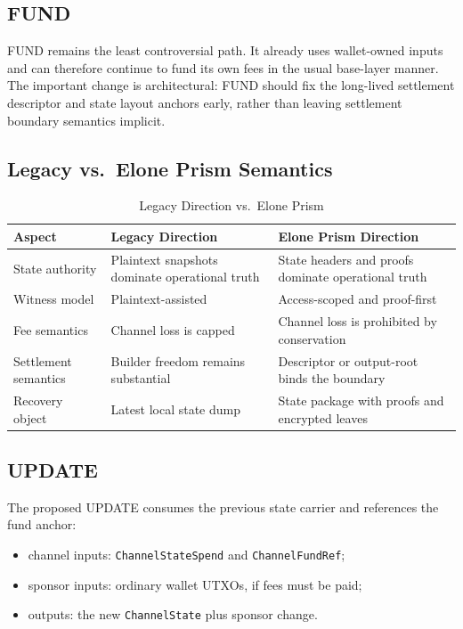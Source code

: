 \documentclass[11pt,a4paper]{article}
\newcommand{\code}[1]{\texttt{#1}}
\begin{document}
\subsection{FUND}

FUND remains the least controversial path. It already uses wallet-owned inputs and can therefore continue to fund its own fees in the usual base-layer manner. The important change is architectural: FUND should fix the long-lived settlement descriptor and state layout anchors early, rather than leaving settlement boundary semantics implicit.

\subsection{Legacy vs.\ Elone Prism Semantics}

\begin{table}[htbp]
\centering
\caption{Legacy Direction vs.\ Elone Prism}
\label{tab:legacy_vs_prism}
\small
\begin{tabularx}{\linewidth}{@{}l X X@{}}
\toprule
\textbf{Aspect} & \textbf{Legacy Direction} & \textbf{Elone Prism Direction} \\
\midrule
State authority & Plaintext snapshots dominate operational truth & State headers and proofs dominate operational truth \\
Witness model & Plaintext-assisted & Access-scoped and proof-first \\
Fee semantics & Channel loss is capped & Channel loss is prohibited by conservation \\
Settlement semantics & Builder freedom remains substantial & Descriptor or output-root binds the boundary \\
Recovery object & Latest local state dump & State package with proofs and encrypted leaves \\
\bottomrule
\end{tabularx}
\end{table}

\subsection{UPDATE}

The proposed UPDATE consumes the previous state carrier and references the fund anchor:
\begin{itemize}
    \item channel inputs: \code{ChannelStateSpend} and \code{ChannelFundRef};
    \item sponsor inputs: ordinary wallet UTXOs, if fees must be paid;
    \item outputs: the new \code{ChannelState} plus sponsor change.
\end{itemize}
\end{document}
